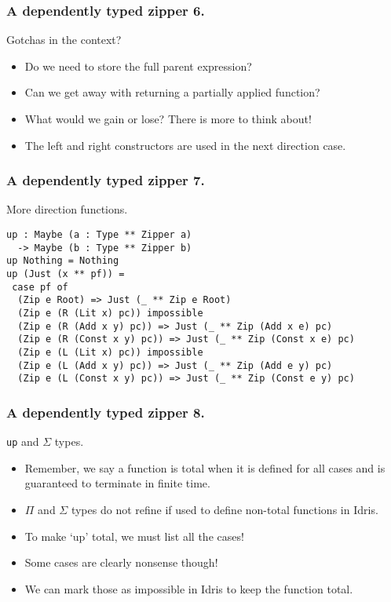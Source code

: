 \documentclass{beamer}
\begin{document}
\begin{frame}[fragile]
  \frametitle{A dependently typed zipper 6.}
  \begin{block}{Gotchas in the context?}
    \begin{itemize}
      \item Do we need to store the full parent expression?
      \item Can we get away with returning a partially applied function?
      \item What would we gain or lose? There is more to think about!
      \item The left and right constructors are used in the next direction
        case.
    \end{itemize}
  \end{block}
\end{frame}

\begin{frame}[fragile]
  \frametitle{A dependently typed zipper 7.}
  \begin{block}{More direction functions.}
    \begin{verbatim}
up : Maybe (a : Type ** Zipper a) 
  -> Maybe (b : Type ** Zipper b)
up Nothing = Nothing
up (Just (x ** pf)) =
 case pf of
  (Zip e Root) => Just (_ ** Zip e Root)
  (Zip e (R (Lit x) pc)) impossible
  (Zip e (R (Add x y) pc)) => Just (_ ** Zip (Add x e) pc)
  (Zip e (R (Const x y) pc)) => Just (_ ** Zip (Const x e) pc)
  (Zip e (L (Lit x) pc)) impossible
  (Zip e (L (Add x y) pc)) => Just (_ ** Zip (Add e y) pc)
  (Zip e (L (Const x y) pc)) => Just (_ ** Zip (Const e y) pc)
    \end{verbatim}
  \end{block}
\end{frame}

\begin{frame}[fragile]
  \frametitle{A dependently typed zipper 8.}
  \begin{block}{\texttt{up} and $\Sigma$ types.}
    \begin{itemize}
      \item Remember, we say a function is total when it is defined
        for all cases and is guaranteed to terminate in finite time.
      \item $\Pi$ and $\Sigma$ types do not refine if used to define
        non-total functions in Idris.
      \item To make `up' total, we must list all the cases!
      \item Some cases are clearly nonsense though!
      \item We can mark those as impossible in Idris to keep the
        function total.
    \end{itemize}
  \end{block}
\end{frame}
\end{document}
